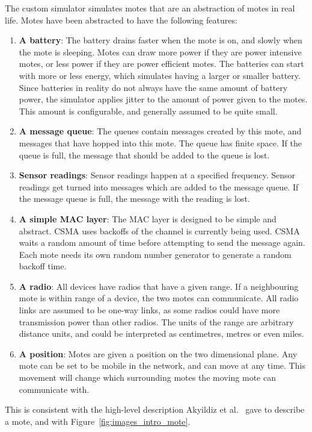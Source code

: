 The custom simulator simulates motes that are an abstraction of motes in real life.
Motes have been abstracted to have the following features:
\begin{enumerate}
	\item \textbf{A battery}: The battery drains faster when the mote is on, and slowly when the mote is sleeping. 
	Motes can draw more power if they are power intensive motes, or less power if they are power efficient motes.
	The batteries can start with more or less energy, which simulates having a larger or smaller battery. Since batteries in
	reality do not always have the same amount of battery power, the 
	simulator applies jitter to the amount of power given to the motes. This amount is configurable, and generally
	assumed to be quite small.
	\item \textbf{A message queue}: The queues contain messages created by this mote, and messages that have hopped into this mote. The 
	queue has finite space. If the queue is full, the message that should be added to the queue is lost.
	\item \textbf{Sensor readings}: Sensor readings happen at a specified frequency. Sensor readings get turned into 
	messages which are added to the message queue. If the message queue is full, the message with the reading is 
	lost.
	\item \textbf{A simple MAC layer}: The MAC layer is designed to be simple and abstract. CSMA uses backoffs of the
	channel is currently being used. CSMA waits a random amount of time before attempting to send the message again. 
	Each mote needs its own random number generator to generate a random backoff time.
	\item \textbf{A radio}: All devices have radios that have a given range. If a neighbouring mote is within range of 
	a device, the two motes can communicate. All radio links are assumed to be one-way links, as some radios
	could have more transmission power than other radios. The units of the range are arbitrary distance units, 
	and could be interpreted as centimetres, metres or even miles.
	\item \textbf{A position}: Motes are given a position on the two dimensional plane. Any mote can be set to 
	be mobile in the network, and can move at any time. This movement will change which surrounding 
	motes the moving mote can communicate with.
\end{enumerate}
This is consistent with the high-level description Akyildiz et al.~\cite{wsnSurvey} gave
to describe a mote, and with Figure~\ref{fig:images_intro_mote}.

